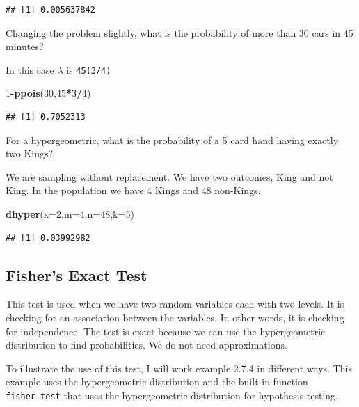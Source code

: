 \documentclass[]{book}
\newenvironment{Shaded}{\begin{snugshade}}{\end{snugshade}}
\newcommand{\KeywordTok}[1]{\textcolor[rgb]{0.13,0.29,0.53}{\textbf{#1}}}
\newcommand{\DataTypeTok}[1]{\textcolor[rgb]{0.13,0.29,0.53}{#1}}
\newcommand{\DecValTok}[1]{\textcolor[rgb]{0.00,0.00,0.81}{#1}}
\newcommand{\OperatorTok}[1]{\textcolor[rgb]{0.81,0.36,0.00}{\textbf{#1}}}
\newcommand{\NormalTok}[1]{#1}
\theoremstyle{definition}
\theoremstyle{definition}
\theoremstyle{definition}
\theoremstyle{remark}
\begin{document}
\begin{verbatim}
## [1] 0.005637842
\end{verbatim}

Changing the problem slightly, what is the probability of more than 30
cars in 45 minutes?

In this case \(\lambda\) is \texttt{45(3/4)}

\begin{Shaded}
\begin{Highlighting}[]
\DecValTok{1}\OperatorTok{-}\KeywordTok{ppois}\NormalTok{(}\DecValTok{30}\NormalTok{,}\DecValTok{45}\OperatorTok{*}\DecValTok{3}\OperatorTok{/}\DecValTok{4}\NormalTok{)}
\end{Highlighting}
\end{Shaded}

\begin{verbatim}
## [1] 0.7052313
\end{verbatim}

For a hypergeometric, what is the probability of a 5 card hand having
exactly two Kings?

We are sampling without replacement. We have two outcomes, King and not
King. In the population we have 4 Kings and 48 non-Kings.

\begin{Shaded}
\begin{Highlighting}[]
\KeywordTok{dhyper}\NormalTok{(}\DataTypeTok{x=}\DecValTok{2}\NormalTok{,}\DataTypeTok{m=}\DecValTok{4}\NormalTok{,}\DataTypeTok{n=}\DecValTok{48}\NormalTok{,}\DataTypeTok{k=}\DecValTok{5}\NormalTok{)}
\end{Highlighting}
\end{Shaded}

\begin{verbatim}
## [1] 0.03992982
\end{verbatim}

\subsection{Fisher's Exact Test}\label{fishers-exact-test}

This test is used when we have two random variables each with two
levels. It is checking for an association between the variables. In
other words, it is checking for independence. The test is exact because
we can use the hypergeometric distribution to find probabilities. We do
not need approximations.

To illustrate the use of this test, I will work example 2.7.4 in
different ways. This example uses the hypergeometric distribution and
the built-in function \texttt{fisher.test} that uses the hypergeometric
distribution for hypothesis testing.
\end{document}
